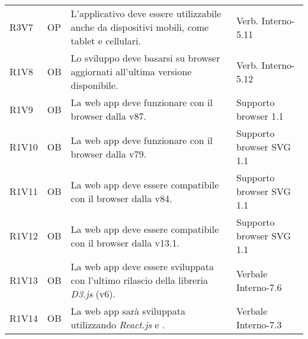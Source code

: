 {\begin{longtable}{C{2cm} | C{1.5cm} | C{9cm} | C{3.3cm}}
R3V7 & OP & L'applicativo deve essere utilizzabile anche da dispositivi mobili, come tablet e cellulari. & Verb. Interno-5.11\\
R1V8 & OB & Lo sviluppo deve basarsi su browser aggiornati all'ultima versione disponibile. & Verb. Interno-5.12\\
R1V9 & OB & La web app deve funzionare con il browser  dalla v87. & Supporto browser  1.1 \\
R1V10 & OB & La web app deve funzionare con il browser  dalla v79. & Supporto browser SVG 1.1 \\
R1V11 & OB & La web app deve essere compatibile con il browser  dalla v84. & Supporto browser SVG 1.1\\
R1V12 & OB & La web app deve essere compatibile con il browser  dalla v13.1. & Supporto browser SVG 1.1\\
R1V13 & OB & La web app deve essere sviluppata con l'ultimo rilascio della libreria \textit{D3.js} (v6). & Verbale Interno-7.6\\
R1V14 & OB & La web app sarà sviluppata utilizzando \textit{React.js} e \textit{}. & Verbale Interno-7.3\\

\end{longtable}
}